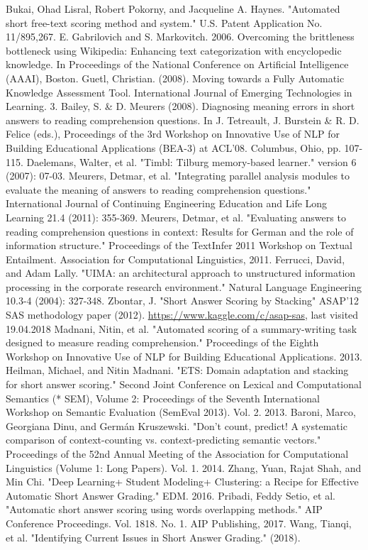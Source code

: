 \documentclass[rnd]{mas_report}
\begin{document}
\begin{thebibliography}{3}
 Bukai, Ohad Lisral, Robert Pokorny, and Jacqueline A. Haynes. "Automated short free-text scoring method and system." U.S. Patent Application No. 11/895,267.
 E. Gabrilovich and S. Markovitch. 2006. Overcoming the brittleness bottleneck using Wikipedia: Enhancing text categorization with encyclopedic knowledge. In Proceedings of the National Conference on Artificial Intelligence (AAAI), Boston.
 Guetl, Christian. (2008). Moving towards a Fully Automatic Knowledge Assessment Tool. International Journal of Emerging Technologies in Learning. 3. 
 Bailey, S. \& D. Meurers (2008). Diagnosing meaning errors in short answers to reading comprehension questions. In J. Tetreault, J. Burstein \& R. D. Felice (eds.), Proceedings of the 3rd Workshop on Innovative Use of NLP for Building Educational Applications (BEA-3) at ACL'08. Columbus, Ohio, pp. 107-115.
 Daelemans, Walter, et al. "Timbl: Tilburg memory-based learner." version 6 (2007): 07-03.
 Meurers, Detmar, et al. "Integrating parallel analysis modules to evaluate the meaning of answers to reading comprehension questions." International Journal of Continuing Engineering Education and Life Long Learning 21.4 (2011): 355-369.
 Meurers, Detmar, et al. "Evaluating answers to reading comprehension questions in context: Results for German and the role of information structure." Proceedings of the TextInfer 2011 Workshop on Textual Entailment. Association for Computational Linguistics, 2011.
 Ferrucci, David, and Adam Lally. "UIMA: an architectural approach to unstructured information processing in the corporate research environment." Natural Language Engineering 10.3-4 (2004): 327-348.
 Zbontar, J. "Short Answer Scoring by Stacking" ASAP'12 SAS methodology paper (2012).
 \url{https://www.kaggle.com/c/asap-sas}, last visited 19.04.2018
 Madnani, Nitin, et al. "Automated scoring of a summary-writing task designed to measure reading comprehension." Proceedings of the Eighth Workshop on Innovative Use of NLP for Building Educational Applications. 2013.
 Heilman, Michael, and Nitin Madnani. "ETS: Domain adaptation and stacking for short answer scoring." Second Joint Conference on Lexical and Computational Semantics (* SEM), Volume 2: Proceedings of the Seventh International Workshop on Semantic Evaluation (SemEval 2013). Vol. 2. 2013.
  Baroni, Marco, Georgiana Dinu, and Germán Kruszewski. "Don't count, predict! A systematic comparison of context-counting vs. context-predicting semantic vectors." Proceedings of the 52nd Annual Meeting of the Association for Computational Linguistics (Volume 1: Long Papers). Vol. 1. 2014.
 Zhang, Yuan, Rajat Shah, and Min Chi. "Deep Learning+ Student Modeling+ Clustering: a Recipe for Effective Automatic Short Answer Grading." EDM. 2016.
 Pribadi, Feddy Setio, et al. "Automatic short answer scoring using words overlapping methods." AIP Conference Proceedings. Vol. 1818. No. 1. AIP Publishing, 2017.
 Wang, Tianqi, et al. "Identifying Current Issues in Short Answer Grading." (2018).



\end{thebibliography}
\end{document}
